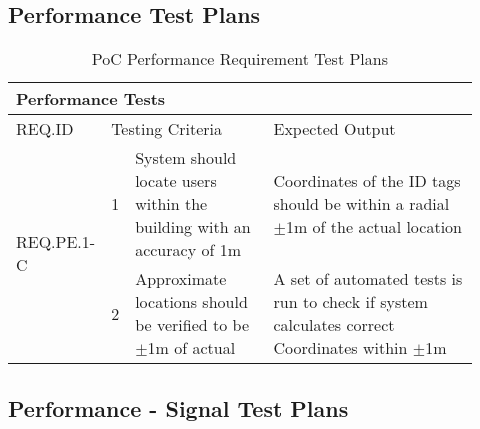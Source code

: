 \subsection{Performance Test Plans}
\begin{table}[h!]
    \centering
    
    \begin{tabular}{|m{0.15\linewidth}|m{0.02\linewidth}|m{0.3\linewidth}|m{0.45\linewidth}|} 
    \hline
    \multicolumn{4}{|l|}{Performance Tests    }      \\ 
    \hline
    REQ.ID      & \multicolumn{2}{l|}{Testing Criteria}      & Expected Output          \\ 
    \hline
    \multirow{2}{*}{REQ.PE.1-C} & 1 
    & System should locate users within the building with an accuracy of 1m
    & Coordinates of the ID tags should be within a radial $\pm$1m of the actual location    \\ 
    \cline{2-4}
    & 2 
    & Approximate locations should be verified to be $\pm$1m of actual 
    & A set of automated tests is run to check if system calculates correct Coordinates 
    within $\pm$1m  \\
    \hline 
\end{tabular}
\caption{PoC Performance Requirement Test Plans}
\end{table}

\break
\subsection{Performance - Signal Test Plans}

